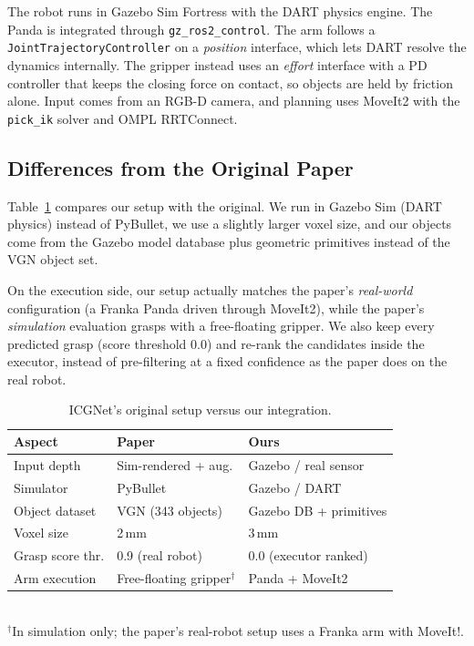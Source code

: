 \documentclass[10pt,twocolumn,letterpaper]{article}
\begin{document}
The robot runs in Gazebo Sim Fortress with the DART physics engine. The Panda is integrated through
\texttt{gz\_ros2\_control}. The arm follows a \texttt{JointTrajectoryController} on a \emph{position}
interface, which lets DART resolve the dynamics internally. The gripper instead uses an \emph{effort}
interface with a PD controller that keeps the closing force on contact, so objects are held by
friction alone. Input comes from an RGB-D camera, and planning uses MoveIt2 with the \texttt{pick\_ik}
solver and OMPL RRTConnect.

\subsection{Differences from the Original Paper}
\label{sec:diff}

Table~\ref{tab:diff} compares our setup with the original. We run in Gazebo Sim (DART physics)
instead of PyBullet, we use a slightly larger voxel size, and our objects come from the Gazebo model
database plus geometric primitives instead of the VGN object set. 

On the execution side, our setup actually matches the paper's \emph{real-world} configuration (a
Franka Panda driven through MoveIt2), while the paper's \emph{simulation} evaluation grasps with a
free-floating gripper. We also keep every predicted grasp (score threshold $0.0$) and re-rank the
candidates inside the executor, instead of pre-filtering at a fixed confidence as the paper does on
the real robot.

\begin{table}[t]
\centering
\footnotesize
\setlength{\tabcolsep}{4pt}
\caption{ICGNet's original setup versus our integration.}
\label{tab:diff}
\begin{tabular}{@{}lp{1.55cm}p{1.85cm}@{}}
\toprule
\textbf{Aspect}     & \textbf{Paper}          & \textbf{Ours} \\
\midrule
Input depth         & Sim-rendered + aug.     & Gazebo / real sensor \\
Simulator           & PyBullet                & Gazebo / DART \\
Object dataset      & VGN (343 objects)       & Gazebo DB + primitives \\
Voxel size          & 2\,mm                   & 3\,mm \\
Grasp score thr.    & 0.9 (real robot)        & 0.0 (executor ranked) \\
Arm execution       & Free-floating gripper$^\dagger$ & Panda + MoveIt2 \\
\bottomrule
\end{tabular}
\\[2pt]
{\scriptsize $^\dagger$In simulation only; the paper's real-robot setup uses a Franka arm with MoveIt!.}
\end{table}
\end{document}
